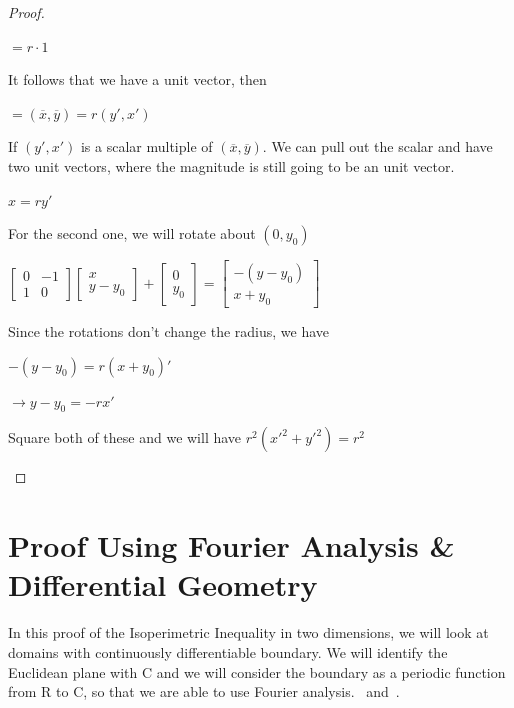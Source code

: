\documentclass[a4paper]{book}
\numberwithin{theorem}{section}%
\begin{document}
\begin{proof}
\begin{enumerate}
\begin{center}
            $\displaystyle =r\cdot1$
        \end{center}
        It follows that we have a unit vector, then
        \begin{center}
            $\displaystyle =(\overline{x},\overline{y})=r(y',x')$
        \end{center}
        If $(y',x')$ is a scalar multiple of $(\overline{x},\overline{y})$. We can pull out the scalar and have two unit vectors, where the magnitude is still going to be an unit vector.
        \begin{center}
            $\displaystyle x=ry'$
        \end{center}
        For the second one, we will rotate about $(0,y_0)$
        \begin{center}
            $\displaystyle \begin{bmatrix}
                0 & -1\\
                1 & 0
            \end{bmatrix}
            \begin{bmatrix}
                x\\
                y-y_{0}
            \end{bmatrix}+
            \begin{bmatrix}
                0\\
                y_{0}
            \end{bmatrix}=\begin{bmatrix}
                -(y-y_{0})\\
                x+y_{0}
            \end{bmatrix}$
        \end{center}
        Since the rotations don't change the radius, we have
        \begin{center}
            $\displaystyle -(y-y_{0})=r(x+y_{0})'$

            $\displaystyle \longrightarrow y-y_{0}=-rx'$
        \end{center}
        Square both of these and we will have $\displaystyle r^{2}(x'^{2}+y'^{2})=r^{2}$
    \end{enumerate}
\end{proof}

\section{Proof Using Fourier Analysis {\&} Differential Geometry}
In this proof of the Isoperimetric Inequality in two dimensions, we will look at domains
with continuously differentiable boundary. We will identify the Euclidean plane with $\mathrm{C}$
and we will consider the boundary as a periodic function from $\mathrm{R}$ to $\mathrm{C}$, so that we are able
to use Fourier analysis.~\citep{bar2010elementare} and~\citep{gehring2019isoperimetric}.
\end{document}

